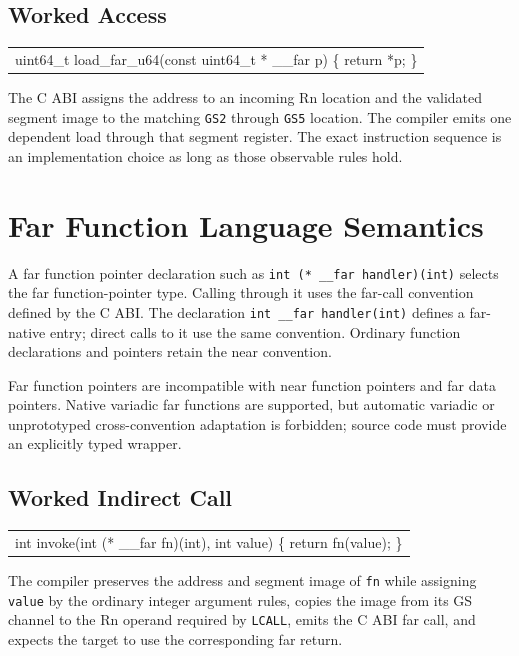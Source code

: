 \documentclass[10pt,twoside]{article}
\begin{document}
\subsection{Worked Access}
\begingroup\small\ttfamily
\begin{tabularx}{\linewidth}{@{}X@{}}
uint64\_t load\_far\_u64(const uint64\_t * \_\_far p) \{ return *p; \}\tabularnewline
\end{tabularx}
\endgroup
The C ABI assigns the address to an incoming Rn location and the validated
segment image to the matching \texttt{GS2} through \texttt{GS5} location. The
compiler emits one dependent load through that segment register. The exact
instruction sequence is an implementation choice as long as those observable
rules hold.

\section{Far Function Language Semantics}\label{page:far-function-language-semantics}
A far function pointer declaration such as
\texttt{int (* \_\_far handler)(int)} selects the far function-pointer type.
Calling through it uses the far-call convention defined by the C ABI. The
declaration \texttt{int \_\_far handler(int)} defines a far-native entry;
direct calls to it use the same convention. Ordinary function declarations
and pointers retain the near convention.

Far function pointers are incompatible with near function pointers and far
data pointers. Native variadic far functions are supported, but automatic
variadic or unprototyped cross-convention adaptation is forbidden; source code
must provide an explicitly typed wrapper.

\subsection{Worked Indirect Call}
\begingroup\small\ttfamily
\begin{tabularx}{\linewidth}{@{}X@{}}
int invoke(int (* \_\_far fn)(int), int value) \{ return fn(value); \}\tabularnewline
\end{tabularx}
\endgroup
The compiler preserves the address and segment image of \texttt{fn} while
assigning \texttt{value} by the ordinary integer argument rules, copies the
image from its GS channel to the Rn operand required by \texttt{LCALL}, emits
the C ABI far call, and expects the target to use the corresponding far return.
\end{document}
